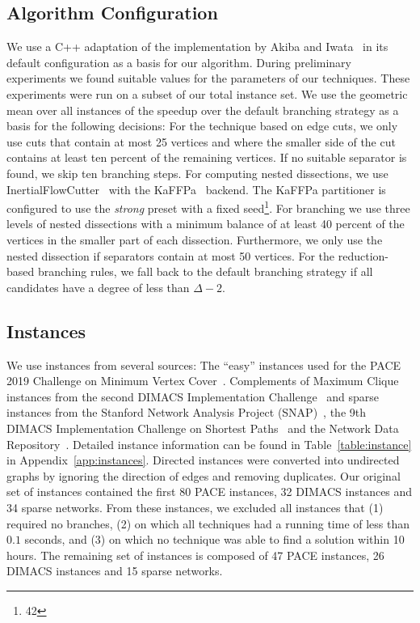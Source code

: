 \documentclass[a4paper,UKenglish,cleveref, autoref, thm-restate]{lipics-v2021}
\begin{document}
\subsection{Algorithm Configuration}\label{sec:algo_conf}
We use a C++ adaptation of the implementation by Akiba and
Iwata~\cite{AkibaIwata} in its default configuration as a basis for our algorithm. During preliminary experiments we found
suitable values for the parameters of
our techniques. These experiments were run on a subset of our total instance
set. We use the geometric mean over all instances of the speedup over the
default branching strategy as a basis for the following decisions: For the technique based on
edge cuts, we only use cuts that contain at most 25 vertices and where the smaller side of
the cut contains at least ten percent of the remaining vertices. If no suitable separator is found, we skip ten branching steps. For computing nested dissections, we use 
InertialFlowCutter~\cite{gottesburen2019faster}
with the KaFFPa~\cite{DBLP:conf/wea/SandersS13}
backend. The KaFFPa partitioner is configured to use the \emph{strong} preset
with a fixed seed\footnote{42}. For branching we use
three levels of nested dissections with a minimum balance of at least 40 percent of the vertices in the smaller part of each dissection. Furthermore, we
only use the nested dissection if separators contain at most
50 vertices. For the reduction-based
branching rules, we fall back to the default branching strategy if all
candidates have a degree of less than $\Delta - 2$. 

\subsection{Instances}
We use instances from several sources: The ``easy'' instances used for the
PACE 2019 Challenge on Minimum Vertex Cover~\cite{dzulfikar_et_al:LIPIcs:2019:11486}. 
Complements of Maximum Clique instances from the second DIMACS Implementation Challenge~\cite{johnson1993cliques} and sparse instances from
the Stanford Network Analysis Project (SNAP)~\cite{snapnets}, the 9th DIMACS
Implementation Challenge on Shortest Paths~\cite{demetrescu2009shortest} and the
Network Data Repository~\cite{nr}. Detailed instance information can
be found in Table~\ref{table:instance} in Appendix~\ref{app:instances}. Directed instances were converted into
undirected graphs by ignoring the direction of edges and removing duplicates.
Our original set of instances contained the first 80 PACE instances, 32 DIMACS instances and 34 sparse networks.
From these instances, we excluded all instances that (1) required no branches, (2) on which all techniques had a running time of less than $0.1$ seconds, and (3) on which no technique was able to find a solution within 10 hours.
The remaining set of instances is composed of 47 PACE instances, 26 DIMACS instances and 15 sparse networks.
\end{document}
